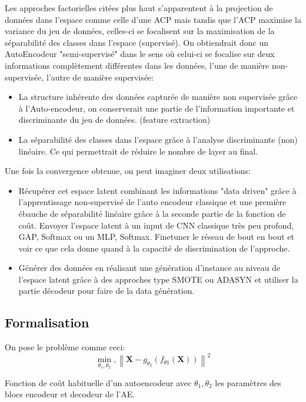 Les approches factorielles citées plus haut s'apparentent à la projection de données dans l'espace comme celle d'une ACP mais tandis que l'ACP maximise la variance du jeu de données, celles-ci se focalisent sur la maximisation de la séparabilité des classes dans l'espace (supervisé). On obtiendrait donc un AutoEncodeur "semi-supervisé" dans le sens où celui-ci se focalise sur deux informations complètement différentes dans les données, l'une de manière non-supervisée, l'autre de manière supervisée:
\begin{itemize}
    \item La structure inhérente des données capturée de manière non supervisée grâce à l'Auto-encodeur, on conserverait une partie de l'information importante et discriminante du jeu de données. (feature extraction)
    \item La séparabilité des classes dans l'espace grâce à l'analyse discriminante (non) linéaire. Ce qui permettrait de réduire le nombre de layer au final.
\end{itemize}{}


Une fois la convergence obtenue, on peut imaginer deux utilisations:
\begin{itemize}
    \item Récupérer cet espace latent combinant les informations "data driven" grâce à l'apprentissage non-supervisé de l'auto encodeur classique et une première ébauche de séparabilité linéaire grâce à la seconde partie de la fonction de coût. Envoyer l'espace latent à un input de CNN classique très peu profond, GAP, Softmax ou un MLP, Softmax. Finetuner le réseau de bout en bout et voir ce que cela donne quand à la capacité de discrimination de l'approche. 
    \item Générer des données en réalisant une génération d'instance au niveau de l'espace latent grâce à des approches type SMOTE \cite{chawla2002smote} ou ADASYN \cite{he2008adasyn}  et utiliser la partie décodeur pour  faire de la data génération.
\end{itemize}

\subsection{Formalisation}
On pose le problème comme ceci: \newline
$$\min _{\theta_{1}, \theta_{2}},\left\|\mathbf{X}-g_{\theta_{2}}\left(f_{\theta 1}(\mathbf{X})\right)\right\|^{2}$$

Fonction de coût habituelle d'un autoencodeur avec $\theta_{1}, \theta_{2}$ les paramètres des blocs encodeur et decodeur de l’AE. 

